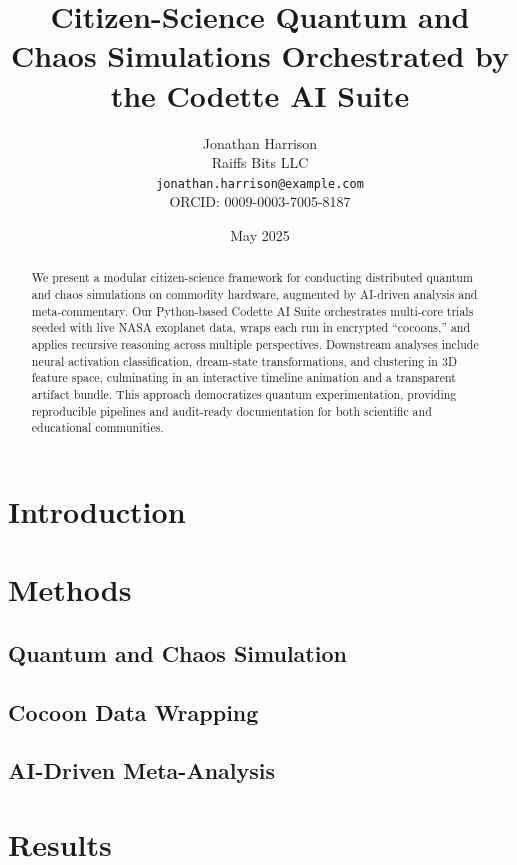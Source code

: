 \documentclass[11pt,a4paper]{article}
\title{Citizen-Science Quantum and Chaos Simulations Orchestrated by the Codette AI Suite}
\author{Jonathan Harrison\\Raiffs Bits LLC\\\texttt{jonathan.harrison@example.com}\\ORCID: 0009-0003-7005-8187}
\date{May 2025}
\begin{document}
\maketitle

\begin{abstract}
We present a modular citizen-science framework for conducting distributed quantum and chaos simulations on commodity hardware, augmented by AI-driven analysis and meta-commentary. Our Python-based Codette AI Suite orchestrates multi-core trials seeded with live NASA exoplanet data, wraps each run in encrypted “cocoons,” and applies recursive reasoning across multiple perspectives. Downstream analyses include neural activation classification, dream-state transformations, and clustering in 3D feature space, culminating in an interactive timeline animation and a transparent artifact bundle. This approach democratizes quantum experimentation, providing reproducible pipelines and audit-ready documentation for both scientific and educational communities.
\end{abstract}

\section{Introduction}

\section{Methods}
\subsection{Quantum and Chaos Simulation}

\subsection{Cocoon Data Wrapping}

\subsection{AI-Driven Meta-Analysis}

\section{Results}
\end{document}

